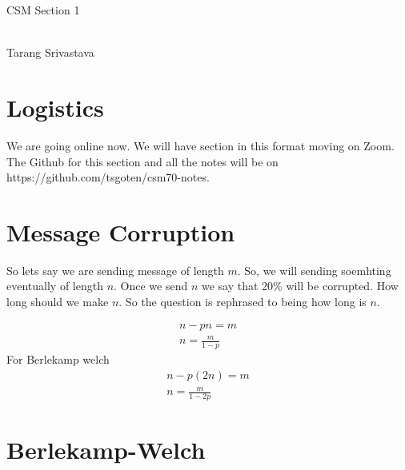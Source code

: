 \documentclass[10pt, twocolumn]{article}
\author{Tarang Srivastava}
\newcommand{\makechaptertitle}[1]{
\begin{center}
	\begin{large}
		#1
	\end{large}
	\begin{small}
		\\Tarang Srivastava
	\end{small}
\end{center}
}
\begin{document}
\makechaptertitle{CSM Section 1}

\section{Logistics}
We are going online now. We will have section in this format moving on Zoom.
The Github for this section and all the notes will be on https://github.com/tsgoten/csm70-notes.

\section{Message Corruption}
So lets say we are sending message of length $ m $. So, we will sending soemhting eventually of length $ n $. Once we send $n $ we say that 20\% will be corrupted. How long should we make $ n $.  
So the question is rephrased to being how long is $ n $.

\begin{align*} 
	n - pn = m \\
	n = \frac{m}{1 -p}
\end{align*}
For Berlekamp welch
\begin{align*} 
	n - p(2n) = m \\
	n = \frac{m}{1 - 2p}
\end{align*}

\section{Berlekamp-Welch}
\end{document}
